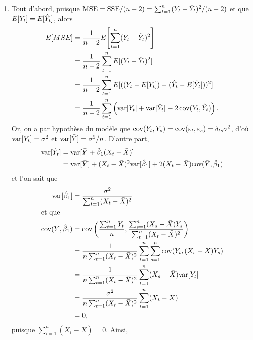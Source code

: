 \begin{solution}{2.8}
    \begin{enumerate}
    \item Tout d'abord, puisque $\mathrm{MSE} = \mathrm{SSE}/(n - 2) = \sum_{t=1}^n
      (Y_t - \hat{Y}_t)^2/(n - 2)$ et que $E [ Y_t ] =
      E [ \hat{Y}_t ]$, alors
      \begin{align*}
        E [ MSE ]
        &= \frac{1}{n - 2} E\! \left[ \sum_{t=1}^n (Y_t - \hat{Y}_t)^2 \right] \\
        &= \frac{1}{n - 2} \sum_{t=1}^n E [ (Y_t - \hat{Y}_t)^2 ] \\
        &= \frac{1}{n - 2} \sum_{t=1}^n E [ ((Y_t - E [ Y_t ]) -
          (\hat{Y}_t - E [ \hat{Y}_t ]))^2 ] \\
        &= \frac{1}{n - 2} \sum_{t=1}^n
        \left(
          \mathrm{var} [ Y_t ] + \mathrm{var} [ \hat{Y}_t ] - 2\, \mathrm{cov}(Y_t, \hat{Y}_t)
        \right).
      \end{align*}
      Or, on a par hypothèse du modèle que $\mathrm{cov}(Y_t, Y_s) =
      \mathrm{cov}(\varepsilon_t, \varepsilon_s) = \delta_{ts} \sigma^2$, d'où
      $\mathrm{var} [ Y_t ] = \sigma^2$ et $\mathrm{var} [ \bar{Y} ] = \sigma^2/n$. D'autre
      part,
      \begin{align*}
        \mathrm{var} [ \hat{Y}_t ]
        &= \mathrm{var} [ \bar{Y} + \hat{\beta}_1 (X_t - \bar{X}) ] \\
        &= \mathrm{var} [ \bar{Y} ] + (X_t - \bar{X})^2 \mathrm{var} [ \hat{\beta}_1 ] +
        2 (X_t - \bar{X}) \mathrm{cov}(\bar{Y}, \hat{\beta}_1)
      \end{align*}
      et l'on sait que
      \begin{align*}
        \mathrm{var} [ \hat{\beta}_1 ]
        &= \frac{\sigma^2}{\sum_{t=1}^n(X_t-\bar{X})^2} \\
        \intertext{et que}
        \mathrm{cov}(\bar{Y}, \hat{\beta}_1)
        & = \mathrm{cov}
        \left(
          \frac{\sum_{t = 1}^n Y_t}{n},
          \frac{\sum_{s = 1}^n (X_s - \bar{X}) Y_s}{\sum_{t = 1}^n
            (X_t - \bar{X})^2}
        \right) \\
        &= \frac{1}{n \sum_{t = 1}^n (X_t - \bar{X})^2}
        \sum_{t = 1}^n \sum_{s = 1}^n \mathrm{cov}(Y_t, (X_s - \bar{X}) Y_s) \\
        &= \frac{1}{n \sum_{t = 1}^n (X_t - \bar{X})^2}
        \sum_{t = 1}^n (X_s - \bar{X}) \mathrm{var} [ Y_t ] \\
        & = \frac{\sigma^2}{n \sum_{t = 1}^n (X_t - \bar{X})^2}
        \sum_{t = 1}^n (X_t - \bar{X}) \\
        & = 0,
      \end{align*}
      puisque $\sum_{i=1}^n(X_i - \bar{X}) = 0$. Ainsi,

\end{enumerate}
\end{solution}
